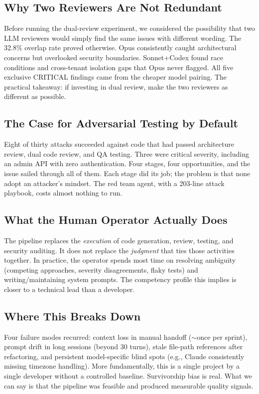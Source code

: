 \documentclass[a4paper,USenglish,cleveref,autoref]{lipics-v2021}
\begin{document}
\subsection{Why Two Reviewers Are Not Redundant}

Before running the dual-review experiment, we considered the possibility that two LLM reviewers would simply find the same issues with different wording. The 32.8\% overlap rate proved otherwise. Opus consistently caught architectural concerns but overlooked security boundaries. Sonnet+Codex found race conditions and cross-tenant isolation gaps that Opus never flagged. All five exclusive CRITICAL findings came from the cheaper model pairing. The practical takeaway: if investing in dual review, make the two reviewers as different as possible.

\subsection{The Case for Adversarial Testing by Default}

Eight of thirty attacks succeeded against code that had passed architecture review, dual code review, and QA testing. Three were critical severity, including an admin API with zero authentication. Four stages, four opportunities, and the issue sailed through all of them. Each stage did its job; the problem is that none adopt an attacker's mindset. The red team agent, with a 203-line attack playbook, costs almost nothing to run.

\subsection{What the Human Operator Actually Does}

The pipeline replaces the \emph{execution} of code generation, review, testing, and security auditing. It does not replace the \emph{judgment} that ties those activities together. In practice, the operator spends most time on resolving ambiguity (competing approaches, severity disagreements, flaky tests) and writing/maintaining system prompts. The competency profile this implies is closer to a technical lead than a developer.

\subsection{Where This Breaks Down}

Four failure modes recurred: context loss in manual handoff (${\sim}$once per sprint), prompt drift in long sessions (beyond 30 turns), stale file-path references after refactoring, and persistent model-specific blind spots (e.g., Claude consistently missing timezone handling). More fundamentally, this is a single project by a single developer without a controlled baseline. Survivorship bias is real. What we can say is that the pipeline was feasible and produced measurable quality signals.
\end{document}
